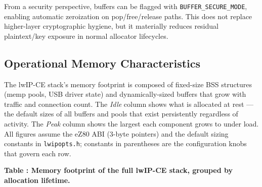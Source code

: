 \documentclass[titlepage]{report}
\begin{document}
			From a security perspective, buffers can be flagged with \texttt{BUFFER\_SECURE\_MODE}, enabling automatic zeroization on pop/free/release paths. This does not replace higher-layer cryptographic hygiene, but it materially reduces residual plaintext/key exposure in normal allocator lifecycles.

			\subsection{Operational Memory Characteristics}

			The lwIP-CE stack's memory footprint is composed of fixed-size BSS structures (memp pools, USB driver state) and dynamically-sized buffers that grow with traffic and connection count. The \textit{Idle} column shows what is allocated at rest --- the default sizes of all buffers and pools that exist persistently regardless of activity. The \textit{Peak} column shows the largest each component grows to under load. All figures assume the eZ80 ABI (3-byte pointers) and the default sizing constants in \texttt{lwipopts.h}; constants in parentheses are the configuration knobs that govern each row.

			\label{tab:lwip-memory}
			\textbf{Table \thetable: Memory footprint of the full lwIP-CE stack, grouped by allocation lifetime.}
\end{document}
